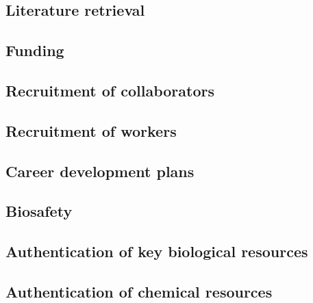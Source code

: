 \documentclass[11pt,letterpaper]{article}
\begin{document}
\subsection{Literature retrieval}
\label{sec:org9dd7574}




\subsection{Funding}
\label{sec:org2a91aaf}



\subsection{Recruitment of collaborators}
\label{sec:org4879478}



\subsection{Recruitment of workers}
\label{sec:orgdf5219a}



\subsection{Career development plans}
\label{sec:org876fb2b}



\subsection{Biosafety}
\label{sec:org7d22fb7}




\subsection{Authentication of key biological resources}
\label{sec:org792fad1}


\subsection{Authentication of chemical resources}
\label{sec:org91a5218}
\end{document}
